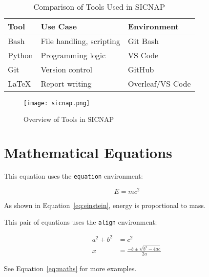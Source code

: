 \documentclass{article}
\begin{document}
\begin{table}[h!]
\centering
\caption{Comparison of Tools Used in SICNAP}
\label{tab:tools}
\begin{tabular}{|l|l|l|}
\hline
\textbf{Tool} & \textbf{Use Case} & \textbf{Environment} \\
\hline
Bash   & File handling, scripting     & Git Bash \\
Python & Programming logic            & VS Code \\
Git    & Version control              & GitHub \\
LaTeX  & Report writing               & Overleaf/VS Code \\
\hline
\end{tabular}
\end{table}

\begin{figure}[h!]
\centering
\texttt{[image: sicnap.png]}
\caption{Overview of Tools in SICNAP}
\label{fig:sicnap}
\end{figure}

\section*{Mathematical Equations}

This equation uses the \texttt{equation} environment:

\begin{equation}
E = mc^2
\label{eq:einstein}
\end{equation}

As shown in Equation~\ref{eq:einstein}, energy is proportional to mass.

This pair of equations uses the \texttt{align} environment:

\begin{align}
a^2 + b^2 &= c^2 \\
x &= \frac{-b \pm \sqrt{b^2 - 4ac}}{2a}
\label{eq:maths}
\end{align}

See Equation~\ref{eq:maths} for more examples.
\end{document}

